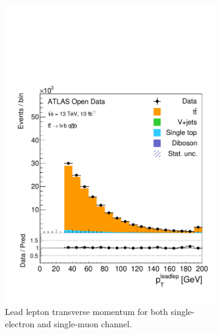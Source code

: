 \documentclass[12pt,a4paper]{article}
\numberwithin{equation}{section}
\begin{document}
\begin{figure}[t!]
  \centering
  \begin{subfigure}[t]{0.47\textwidth}
    \centering
    \includegraphics[width=1.0\textwidth]{figures/hist_leadleptpt}
    \caption{\label{fig:leppt}Lead lepton transverse momentum for both
      single-electron and single-muon channel.}
  \end{subfigure}%
  \hfill{}
  \begin{subfigure}[t]{0.47\textwidth}
    \centering

\end{subfigure}
\end{figure}
\end{document}
